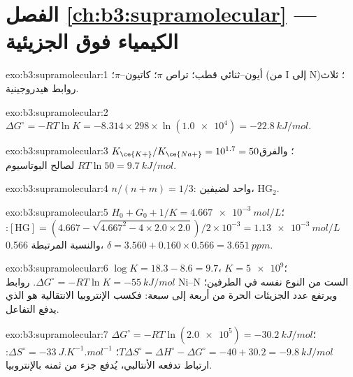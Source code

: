 \section*{الفصل \ref{ch:b3:supramolecular} --- الكيمياء فوق الجزيئية}

\begin{solution}{exo:b3:supramolecular:1}
أيون--ثنائي قطب؛ تراص $\pi$؛ كاتيون--$\pi$؛  (من I إلى N)؛ ثلاث روابط هيدروجينية.
\end{solution}

\begin{solution}{exo:b3:supramolecular:2}
$\Delta G^\circ = -RT\ln K = -8.314 \times 298 \times \ln(\num{1.0e4}) = \qty{-22.8}{kJ/mol}$.
\end{solution}

\begin{solution}{exo:b3:supramolecular:3}
$K_{\ce{K+}}/K_{\ce{Na+}} = 10^{1.7} = 50$؛ والفرق $RT\ln 50 = \qty{9.7}{kJ/mol}$ لصالح البوتاسيوم.
\end{solution}

\begin{solution}{exo:b3:supramolecular:4}
$n/(n + m) = 1/3$:  واحد لضيفين، $\mathrm{HG_2}$.
\end{solution}

\begin{solution}{exo:b3:supramolecular:5}
$H_0 + G_0 + 1/K = \qty{4.667e-3}{mol/L}$؛ $[\mathrm{HG}] = (4.667 - \sqrt{4.667^2 - 4 \times 2.0 \times 2.0})/2 \times 10^{-3} = \qty{1.13e-3}{mol/L}$: والنسبة
المرتبطة 0.566، $\delta = 3.560 + 0.160 \times 0.566 = \qty{3.651}{ppm}$.
\end{solution}

\begin{solution}{exo:b3:supramolecular:6}
$\log K = 18.3 - 8.6 = 9.7$، $K = \num{5e9}$؛ $\Delta G^\circ = -RT\ln K = \qty{-55}{kJ/mol}$. روابط Ni--N الست من
النوع نفسه في الطرفين؛ ويرتفع عدد الجزيئات الحرة من أربعة إلى
سبعة: فكسب الإنتروبيا الانتقالية هو الذي يدفع التفاعل.
\end{solution}

\begin{solution}{exo:b3:supramolecular:7}
$\Delta G^\circ = -RT\ln(\num{2.0e5}) = \qty{-30.2}{kJ/mol}$؛ $T\Delta S^\circ = \Delta H^\circ - \Delta G^\circ = -40 + 30.2 = \qty{-9.8}{kJ/mol}$؛
$\Delta S^\circ = \qty{-33}{J.K^{-1}.mol^{-1}}$: ارتباط تدفعه الأنتالبي، يُدفع جزء من ثمنه بالإنتروبيا.
\end{solution}

